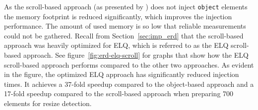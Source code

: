\documentclass{acm_proc_article-sp}
\newcommand{\code}[1]{\texttt{#1}}
\newcommand{\elq}{ELQ}
\begin{document}
    As the scroll-based approach (as presented by \cite{backalley}) does not inject \code{object} elements the memory footprint is reduced significantly, which improves the injection performance.
    The amount of used memory is so low that reliable measurements could not be gathered.
    Recall from Section~\ref{sec:imp_erd} that the scroll-based approach was heavily optimized for \elq{}, which is referred to as the \elq{} scroll-based approach.
    See figure~\ref{fig:erd-elq-scroll} for graphs that show how the \elq{} scroll-based approach performs compared to the other two approaches.
    As evident in the figure, the optimized \elq{} approach has significantly reduced injection times.
    It achieves a 37-fold speedup compared to the object-based approach and a 17-fold speedup compared to the scroll-based approach when preparing 700 elements for resize detection.

    


\end{document}
